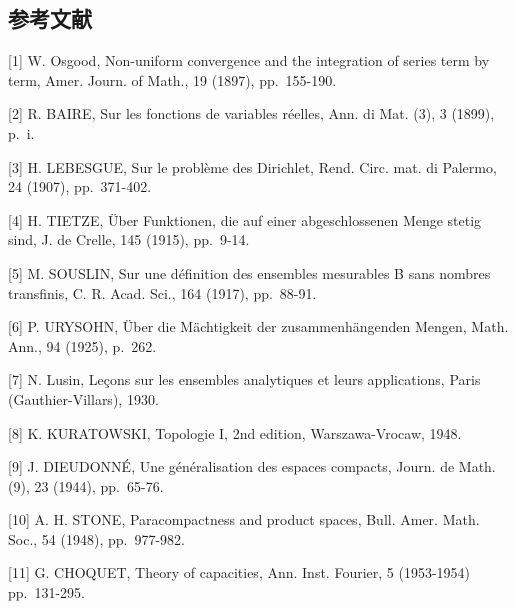 \subsection*{参考文献}

{[}1{]} W. Osgood, Non-uniform convergence and the integration of series term by term, Amer. Journ. of Math., 19 (1897), pp.~155-190.

{[}2{]} R. BAIRE, Sur les fonctions de variables réelles, Ann. di Mat. (3), 3 (1899), p.~i.

{[}3{]} H. LEBESGUE, Sur le problème des Dirichlet, Rend. Circ. mat. di Palermo, 24 (1907), pp.~371-402.

{[}4{]} H. TIETZE, Über Funktionen, die auf einer abgeschlossenen Menge stetig sind, J. de Crelle, 145 (1915), pp.~9-14.

{[}5{]} M. SOUSLIN, Sur une définition des ensembles mesurables B sans nombres transfinis, C. R. Acad. Sci., 164 (1917), pp.~88-91.

{[}6{]} P. URYSOHN, Über die Mächtigkeit der zusammenhängenden Mengen, Math. Ann., 94 (1925), p.~262.

{[}7{]} N. Lusin, Leçons sur les ensembles analytiques et leurs applications, Paris (Gauthier-Villars), 1930.

{[}8{]} K. KURATOWSKI, Topologie I, 2nd edition, Warszawa-Vrocaw, 1948.

{[}9{]} J. DIEUDONNÉ, Une généralisation des espaces compacts, Journ. de Math. (9), 23 (1944), pp.~65-76.

{[}10{]} A. H. STONE, Paracompactness and product spaces, Bull. Amer. Math. Soc., 54 (1948), pp.~977-982.

{[}11{]} G. CHOQUET, Theory of capacities, Ann. Inst. Fourier, 5 (1953-1954) pp.~131-295.

\ResumeMainChapters
